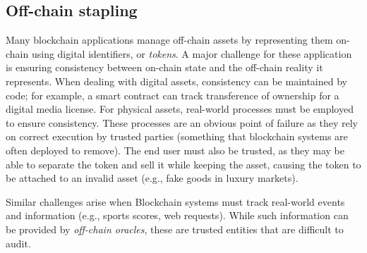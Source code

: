\subsection{Off-chain stapling}
Many blockchain applications manage off-chain assets by representing them 
on-chain using digital identifiers, or \textit{tokens}. A major challenge for 
these application is ensuring consistency between on-chain state and the 
off-chain reality it represents.
When dealing with digital assets, consistency can be maintained by code; for 
example, a smart contract can track transference of ownership for a digital 
media license.
For physical assets, real-world processes must be employed to ensure 
consistency. These processes are an obvious point of failure as they rely on 
correct execution by trusted parties (something that blockchain systems are 
often deployed to remove).
The end user must also be trusted, as they may be able to separate the token and sell it while keeping the asset, causing the token to be attached to an invalid asset (e.g., fake goods in luxury markets).

Similar challenges arise when Blockchain systems must track real-world events and information (e.g., sports scores, web requests).
While such information can be provided by \emph{off-chain oracles}, these are trusted entities that are difficult to audit.


